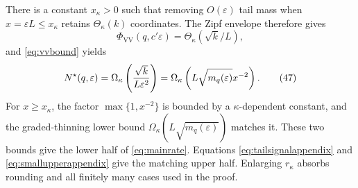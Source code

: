 There is a constant $x_\kappa>0$ such that removing
$O(\varepsilon)$ tail mass when $x=\varepsilon L\leq x_\kappa$ retains
$\Theta_\kappa(k)$ coordinates. The Zipf envelope therefore gives
\[
 \Phi_{\mathrm{VV}}(q,c'\varepsilon)
 =\Theta_\kappa(\sqrt k/L),
\]
and \eqref{eq:vvbound} yields
\[
 N^\star(q,\varepsilon)
 =\Omega_\kappa\left(\frac{\sqrt k}{L\varepsilon^2}\right)
 =\Omega_\kappa\left(L\sqrt{m_q(\varepsilon)}x^{-2}\right).    \tag{47}\label{eq:finelower}
\]
For $x\geq x_\kappa$, the factor $\max\{1,x^{-2}\}$ is bounded by a
$\kappa$-dependent constant, and the graded-thinning lower bound
$\Omega_\kappa(L\sqrt{m_q(\varepsilon)})$ matches it. These two bounds
give the lower half of \eqref{eq:mainrate}. Equations
\eqref{eq:tailsignalappendix} and \eqref{eq:smallupperappendix} give the
matching upper half. Enlarging $r_\kappa$ absorbs rounding and all finitely
many cases used in the proof.
